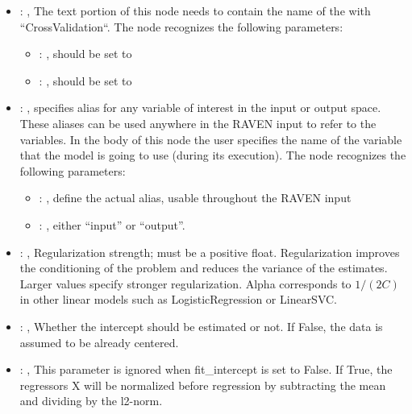 \begin{itemize}
    \item {}: , 
      The text portion of this node needs to contain the name of the  with
               ``CrossValidation``.
      The  node recognizes the following parameters:
        \begin{itemize}
          \item {}: , 
            should be set to 
          \item {}: , 
            should be set to 
      \end{itemize}

    \item {}: , 
      specifies alias for         any variable of interest in the input or output space. These
      aliases can be used anywhere in the RAVEN input to         refer to the variables. In the body
      of this node the user specifies the name of the variable that the model is going to use
      (during its execution).
      The  node recognizes the following parameters:
        \begin{itemize}
          \item {}: , 
            define the actual alias, usable throughout the RAVEN input
          \item {}: , 
            either ``input'' or ``output''.
      \end{itemize}

    \item {}: , 
      Regularization strength; must be a positive float. Regularization
      improves the conditioning of the problem and reduces the variance of the estimates.
      Larger values specify stronger regularization. Alpha corresponds to $1 / (2C)$ in other
      linear models such as LogisticRegression or LinearSVC.

    \item {}: , 
      Whether the intercept should be estimated or not. If False,
      the data is assumed to be already centered.

    \item {}: , 
      This parameter is ignored when fit\_intercept is set to False. If True, the
      regressors X will be normalized before regression by subtracting the mean and dividing
      by the l2-norm.


\end{itemize}

